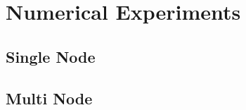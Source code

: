 \chapter{Numerical Experiments}\label{chpt:experiments}
\thispagestyle{chaptertitle} %


\section{Single Node}

\section{Multi Node}

